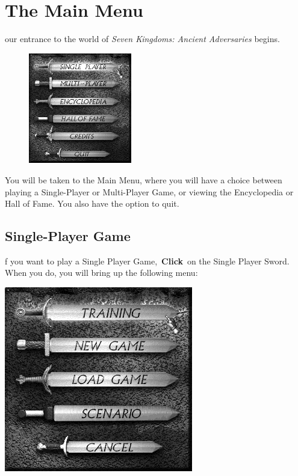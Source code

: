 \clearpage

\section{The Main Menu}

our entrance to the world of \textit{Seven Kingdoms: Ancient Adversaries} begins.

\begin{figure}
	\begin{center}
		\vspace{-20pt}
		\includegraphics[width=0.4\textwidth]{SWmainmenu}
	\end{center}
	\vspace{-20pt}
\end{figure}

You will be taken to the Main Menu, where you will have a choice between playing a Single-Player or Multi-Player Game, or viewing the Encyclopedia or Hall of Fame. You also have the option to quit.

\subsection{Single-Player Game}


f you want to play a Single Player Game, \textbf{Click} on the Single Player Sword. When you do, you will bring up the following menu: 


\begin{center}
\includegraphics[width=0.5\linewidth]{SWsingleplayer}
\end{center}

